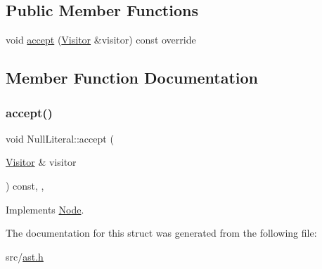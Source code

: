 \subsection*{Public Member Functions}
\begin{DoxyCompactItemize}
\item 
void \hyperlink{struct_null_literal_a988e617d768c43d45b330dc8ed245b72}{accept} (\hyperlink{struct_visitor}{Visitor} \&visitor) const override
\end{DoxyCompactItemize}


\subsection{Member Function Documentation}
\mbox{\label{struct_null_literal_a988e617d768c43d45b330dc8ed245b72}} 
\subsubsection{\texorpdfstring{accept()}{accept()}}
{\footnotesize\ttfamily void Null\+Literal\+::accept (\begin{DoxyParamCaption}\item[{\hyperlink{struct_visitor}{Visitor} \&}]{visitor }\end{DoxyParamCaption}) const\hspace{0.3cm}{\ttfamily [inline]}, {\ttfamily [override]}, {\ttfamily [virtual]}}



Implements \hyperlink{struct_node_a10bd7af968140bbf5fa461298a969c71}{Node}.



The documentation for this struct was generated from the following file\+:\begin{DoxyCompactItemize}
\item 
src/\hyperlink{ast_8h}{ast.\+h}\end{DoxyCompactItemize}
